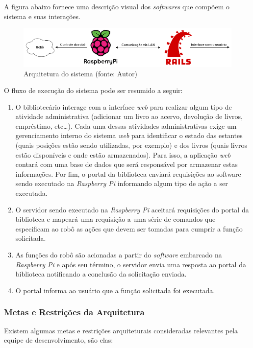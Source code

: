 A figura abaixo fornece uma descrição visual dos \textit{softwares} que compõem o sistema e suas interações.

\begin{figure}[!h]
\centering
\includegraphics[scale=0.50, angle = 360]{figuras/arquitetura_1}
\caption[]{Arquitetura do sistema (fonte: Autor)}
\end{figure}
\FloatBarrier

O fluxo de execução do sistema pode ser resumido a seguir:

\begin{enumerate}
    \item O bibliotecário interage com a interface \textit{web} para realizar algum tipo de atividade administrativa (adicionar um livro ao acervo, devolução de livros, empréstimo, etc…). Cada uma dessas atividades administrativas exige um gerenciamento interno do sistema \textit{web} para identificar o estado das estantes (quais posições estão sendo utilizadas, por exemplo) e dos livros (quais livros estão disponíveis e onde estão armazenados). Para isso, a aplicação \textit{web} contará com uma base de dados que será responsável por armazenar estas informações. Por fim, o portal da biblioteca enviará requisições ao software sendo executado na \textit{Raspberry Pi} informando algum tipo de ação a ser executada.

    \item O servidor sendo executado na \textit{Raspberry Pi} aceitará requisições do portal da biblioteca e mapeará uma requisição a uma série de comandos que especificam ao robô as ações que devem ser tomadas para cumprir a função solicitada.

    \item As funções do robô são acionadas a partir do \textit{software} embarcado na \textit{Raspberry Pi} e após seu término, o servidor envia uma resposta ao portal da biblioteca notificando a conclusão da solicitação enviada.

    \item O portal informa ao usuário que a função solicitada foi executada.
\end{enumerate}

\subsubsection{Metas e Restrições da Arquitetura}
Existem algumas metas e restrições arquiteturais consideradas relevantes pela equipe de desenvolvimento, são elas:

